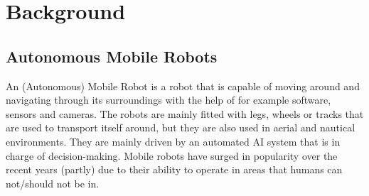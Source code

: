 \section{Background}

\subsection{Autonomous Mobile Robots}
An (Autonomous) Mobile Robot is a robot that is capable of moving around and navigating through its
surroundings with the help of for example software, sensors and cameras. The robots
are mainly fitted with legs, wheels or tracks that are used to transport itself around, but
they are also used in aerial and nautical environments. They are mainly driven by an
automated AI system that is in charge of decision-making. Mobile robots have surged in
popularity over the recent years (partly) due to their ability to operate in areas that
humans can not/should not be in\cite{KateBrush1Robots}.

